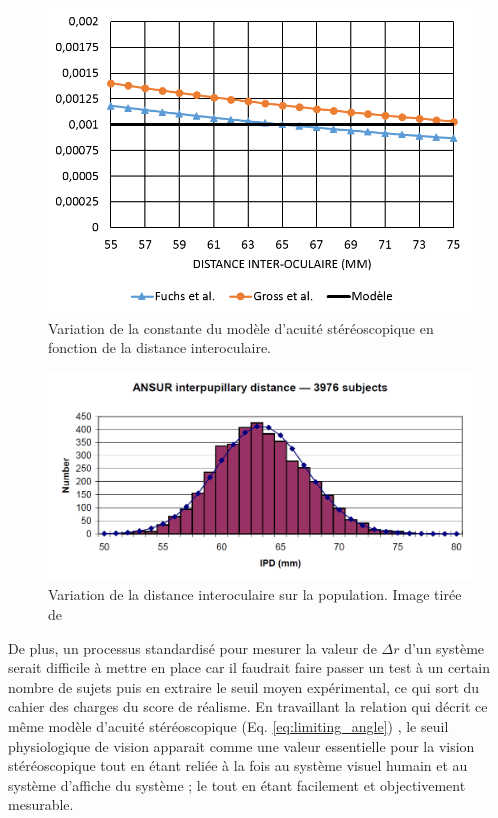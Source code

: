 	\begin{figure}
		\centering
		\includegraphics[scale=1]{Figures/FractionVariation}
		\caption{Variation de la constante du modèle d'acuité stéréoscopique en fonction de la distance interoculaire.}
		\label{fig:variation_constante_dio}
	\end{figure}
	
	\begin{figure}
		\centering
		\includegraphics[scale=.5]{Figures/ANSURIPD}
		\caption{Variation de la distance interoculaire sur la population. Image tirée de \citep{dodgson_variation_2004}}
		\label{fig:variation_dio_population}
	\end{figure}
	
	\par De plus, un processus standardisé pour mesurer la valeur de $\Delta r$ d'un système serait difficile à mettre en place car il faudrait faire passer un test à un certain nombre de sujets puis en extraire le seuil moyen expérimental, ce qui sort du cahier des charges du score de réalisme. En travaillant la relation qui décrit ce même modèle d'acuité stéréoscopique (Eq. \ref{eq:limiting_angle}) \citep{gross_human_2008}, le seuil physiologique de vision apparait comme une valeur essentielle pour la vision stéréoscopique tout en étant reliée à la fois au système visuel humain et au système d'affiche du système ; le tout en étant facilement et objectivement mesurable. 
	
